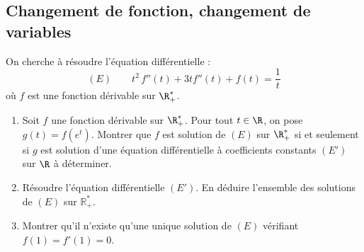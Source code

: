 \documentclass[a4paper,twoside,french,11pt]{VcCours}
\begin{document}


\subsection{Changement de fonction, changement de variables}


\begin{Exercice}{} On cherche à résoudre l'équation différentielle :
$$ (E) \qquad t^2\,f''(t) + 3 t f''(t)+f(t)  = \dfrac{1}{t} $$
où $f$ est une fonction dérivable sur $\R_+^*$.
\begin{enumerate}
\item Soit $f$ une fonction dérivable sur $\R_+^*$. Pour tout $t\in \R$, on pose $g(t)=f(e^{t})$. Montrer que $f$ est solution de $(E)$ sur $\R_+^*$ si et seulement si $g$ est solution d'une équation différentielle à coefficients constants $(E')$ sur $\R$ à déterminer.
\item Résoudre l'équation différentielle $(E')$. En déduire l'ensemble des solutions de $(E)$ sur $\mathbb{R}^*_+$.
\item Montrer qu'il n'existe qu'une unique solution de $(E)$ vérifiant $f(1)=f'(1)=0$.
\end{enumerate}
\end{Exercice}
\end{document}
